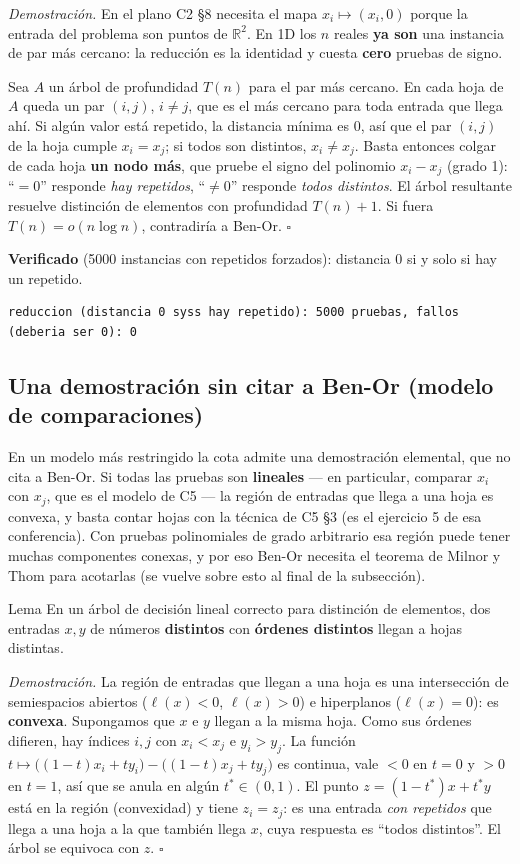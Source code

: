 \documentclass[11pt]{article}
\begin{document}
\textit{Demostración.} En el plano C2 §8 necesita el mapa $x_i\mapsto(x_i,0)$ porque la entrada del
problema son puntos de $\mathbb{R}^2$. En 1D los $n$ reales \textbf{ya son} una instancia de par más
cercano: la reducción es la identidad y cuesta \textbf{cero} pruebas de signo.

Sea $A$ un árbol de profundidad $T(n)$ para el par más cercano. En cada hoja de $A$ queda un par $(i,j)$,
$i\ne j$, que es el más cercano para toda entrada que llega ahí. Si algún valor está repetido, la distancia
mínima es $0$, así que el par $(i,j)$ de la hoja cumple $x_i=x_j$; si todos son distintos, $x_i\neq x_j$.
Basta entonces colgar de cada hoja \textbf{un nodo más}, que pruebe el signo del polinomio $x_i-x_j$ (grado 1):
``$=0$'' responde \emph{hay repetidos}, ``$\ne0$'' responde \emph{todos distintos}. El árbol resultante
resuelve distinción de elementos con profundidad $T(n)+1$. Si fuera $T(n)=o(n\log n)$, contradiría a
Ben-Or. $\square$

\textbf{Verificado} (5000 instancias con repetidos forzados): distancia $0$ si y solo si hay un repetido.
\begin{lstlisting}[style=salida]
reduccion (distancia 0 syss hay repetido): 5000 pruebas, fallos (deberia ser 0): 0
\end{lstlisting}

\subsection{Una demostración sin citar a Ben-Or (modelo de comparaciones)}

En un modelo más restringido la cota admite una demostración elemental, que no cita a Ben-Or. Si todas las
pruebas son \textbf{lineales} --- en particular, comparar $x_i$ con $x_j$, que es el modelo de C5 --- la región
de entradas que llega a una hoja es convexa, y basta contar hojas con la técnica de C5 §3 (es el ejercicio 5
de esa conferencia). Con pruebas polinomiales de grado arbitrario esa región puede tener muchas componentes
conexas, y por eso Ben-Or necesita el teorema de Milnor y Thom para acotarlas (se vuelve sobre esto al final
de la subsección).

\begin{resultado}{Lema}
En un árbol de decisión lineal correcto para distinción de elementos, dos entradas $x,y$ de números
\textbf{distintos} con \textbf{órdenes distintos} llegan a hojas distintas.
\end{resultado}

\textit{Demostración.} La región de entradas que llegan a una hoja es una intersección de semiespacios
abiertos ($\ell(x)<0$, $\ell(x)>0$) e hiperplanos ($\ell(x)=0$): es \textbf{convexa}. Supongamos que $x$ e
$y$ llegan a la misma hoja. Como sus órdenes difieren, hay índices $i,j$ con $x_i<x_j$ e $y_i>y_j$. La
función $t\mapsto\big((1-t)x_i+ty_i\big)-\big((1-t)x_j+ty_j\big)$ es continua, vale $<0$ en $t=0$ y $>0$ en
$t=1$, así que se anula en algún $t^\ast\in(0,1)$. El punto $z=(1-t^\ast)x+t^\ast y$ está en la región
(convexidad) y tiene $z_i=z_j$: es una entrada \emph{con repetidos} que llega a una hoja a la que también
llega $x$, cuya respuesta es ``todos distintos''. El árbol se equivoca con $z$. $\square$
\end{document}
